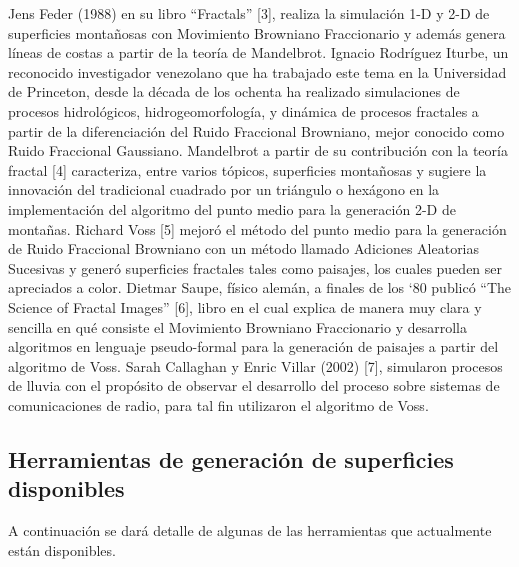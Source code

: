 \documentclass[12pt]{article} %
\begin{document}
Jens Feder (1988) en su libro “Fractals” [3], realiza la simulación 1-D y 2-D de superficies  montañosas con Movimiento Browniano Fraccionario y además genera líneas de costas a partir de la teoría de Mandelbrot.
Ignacio Rodríguez Iturbe, un reconocido investigador venezolano que ha trabajado este tema en la Universidad de Princeton, desde la década de los ochenta ha realizado simulaciones de procesos hidrológicos, hidrogeomorfología, y dinámica de procesos fractales a partir de la diferenciación del Ruido Fraccional Browniano, mejor conocido como Ruido Fraccional Gaussiano.
Mandelbrot a partir de su contribución con la teoría fractal [4] caracteriza, entre varios tópicos, superficies montañosas y sugiere la innovación del tradicional cuadrado por un triángulo o hexágono en la implementación del algoritmo del punto medio para la generación 2-D de montañas.
Richard Voss [5] mejoró el método del punto medio para la generación de Ruido Fraccional Browniano con un método llamado Adiciones Aleatorias Sucesivas y generó superficies fractales tales como paisajes, los cuales pueden ser apreciados a color.
Dietmar Saupe, físico alemán, a finales de los ‘80 publicó “The Science of Fractal Images” [6], libro en el cual explica de manera muy clara y sencilla en qué consiste el Movimiento Browniano Fraccionario y desarrolla algoritmos en lenguaje pseudo-formal para la generación de paisajes a partir del algoritmo de Voss.
Sarah Callaghan y Enric Villar (2002) [7], simularon procesos de lluvia con el propósito de observar el desarrollo del proceso sobre sistemas de comunicaciones de radio, para tal fin utilizaron el algoritmo de Voss.


\subsection{Herramientas de generación de superficies disponibles}
A continuación se dará detalle de algunas de las herramientas que actualmente están disponibles.

\end{document}
